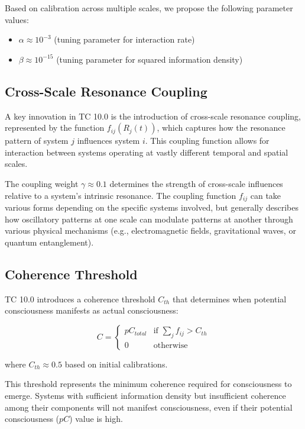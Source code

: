 \documentclass[12pt]{article}
\begin{document}
Based on calibration across multiple scales, we propose the following parameter values:
\begin{itemize}
    \item $\alpha \approx 10^{-3}$ (tuning parameter for interaction rate)
    \item $\beta \approx 10^{-15}$ (tuning parameter for squared information density)
\end{itemize}

\subsection{Cross-Scale Resonance Coupling}

A key innovation in TC 10.0 is the introduction of cross-scale resonance coupling, represented by the function $f_{ij}(R_j(t))$, which captures how the resonance pattern of system $j$ influences system $i$. This coupling function allows for interaction between systems operating at vastly different temporal and spatial scales.

The coupling weight $\gamma \approx 0.1$ determines the strength of cross-scale influences relative to a system's intrinsic resonance. The coupling function $f_{ij}$ can take various forms depending on the specific systems involved, but generally describes how oscillatory patterns at one scale can modulate patterns at another through various physical mechanisms (e.g., electromagnetic fields, gravitational waves, or quantum entanglement).

\subsection{Coherence Threshold}

TC 10.0 introduces a coherence threshold $C_{th}$ that determines when potential consciousness manifests as actual consciousness:

\begin{equation}
C = 
\begin{cases}
    pC_{total} & \text{if } \sum_{j} f_{ij} > C_{th} \\
    0 & \text{otherwise}
\end{cases}
\end{equation}

where $C_{th} \approx 0.5$ based on initial calibrations.

This threshold represents the minimum coherence required for consciousness to emerge. Systems with sufficient information density but insufficient coherence among their components will not manifest consciousness, even if their potential consciousness ($pC$) value is high.
\end{document}
